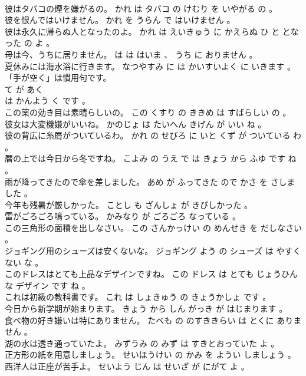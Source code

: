 \documentclass[8pt]{extreport}
\begin{document}
\begin{CJK}{UTF8}{min}
\\	彼はタバコの煙を嫌がるの。	かれ は タバコ の けむり を いやがる の 。 
\\	彼を恨んではいけません。	かれ を うらん で はいけません 。 
\\	彼は永久に帰らぬ人となったのよ。	かれ は えいきゅう に かえらぬ ひ と となった の よ 。 
\\	母は今、うちに居りません。	は は はいま 、 うち に おりません 。 
\\	夏休みには海水浴に行きます。	なつやすみ に は かいすいよく に いきます 。 
\\	「手が空く」は慣用句です。	
\\	て が あく 
\\	は かんよう く です 。 
\\	この薬の効き目は素晴らしいの。	この くすり の ききめ は すばらしい の 。 
\\	彼女は大変機嫌がいいね。	かのじょ は たいへん きげん が いい ね 。 
\\	彼の背広に糸屑がついているわ。	かれ の せびろ に いと くず が ついている わ 。 
\\	暦の上では今日から冬ですね。	こよみ の うえ で は きょう から ふゆ です ね 。 
\\	雨が降ってきたので傘を差しました。	あめ が ふってきた ので かさ を さしました 。 
\\	今年も残暑が厳しかった。	ことし も ざんしょ が きびしかった 。 
\\	雷がごろごろ鳴っている。	かみなり が ごろごろ なっている 。 
\\	この三角形の面積を出しなさい。	この さんかっけい の めんせき を だしなさい 。 
\\	ジョギング用のシューズは安くないな。	ジョギング よう の シューズ は やすくない な 。 
\\	このドレスはとても上品なデザインですね。	この ドレス は とても じょうひん な デザイン です ね 。 
\\	これは初級の教科書です。	これ は しょきゅう の きょうかしょ です 。 
\\	今日から新学期が始まります。	きょう から しん がっき が はじまります 。 
\\	食べ物の好き嫌いは特にありません。	たべも の のすききらい は とくに ありません 。 
\\	湖の水は透き通っていたよ。	みずうみ の みず は すきとおっていた よ 。 
\\	正方形の紙を用意しましょう。	せいほうけい の かみ を ようい しましょう 。 
\\	西洋人は正座が苦手よ。	せいよう じん は せいざ が にがて よ 。 

\end{CJK}
\end{document}
